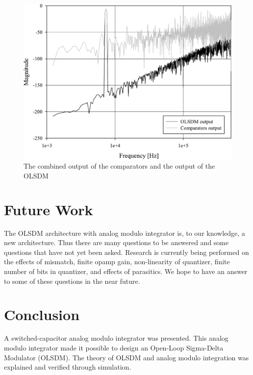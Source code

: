 \begin{figure}[ht]
\centering 
 \includegraphics[width=\myfigwidth]{graphics/simmodint}
  \caption{The combined output of the comparators and the output of the OLSDM}
  \label{p3fig:simmodint}
\end{figure}

\section{Future Work}
The OLSDM architecture with analog modulo
integrator is, to our knowledge, a new architecture. Thus there are many questions to be
answered and some questions that have not yet been asked. Research is
currently being performed on the effects of mismatch, finite opamp
gain, non-linearity of quantizer, finite number of bits in quantizer,
and effects of parasitics. We hope to have an answer to some of these
questions in the near future.  
 
\section{Conclusion}
A switched-capacitor analog modulo integrator was presented. This analog modulo
integrator made it possible to design  
an Open-Loop Sigma-Delta Modulator (OLSDM). The theory of OLSDM and
analog modulo integration was explained and verified through simulation.


